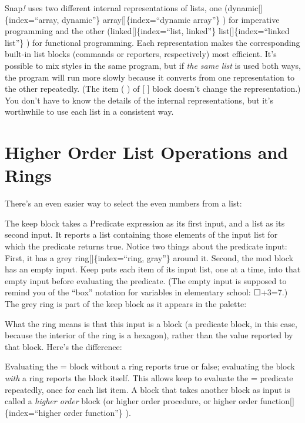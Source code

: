 \documentclass[
  letterpaper,
]{book}
\begin{document}
Snap\emph{!} uses two different internal representations of lists, one
(dynamic{[}{]}\{index=``array, dynamic''\} array{[}{]}\{index=``dynamic
array''\} ) for imperative programming and the other
(linked{[}{]}\{index=``list, linked''\} list{[}{]}\{index=``linked
list''\} ) for functional programming. Each representation makes the
corresponding built-in list blocks (commands or reporters, respectively)
most efficient. It's possible to mix styles in the same program, but if
\emph{the same list} is used both ways, the program will run more slowly
because it converts from one representation to the other repeatedly.
(The item ( ) of {[} {]} block doesn't change the representation.) You
don't have to know the details of the internal representations, but it's
worthwhile to use each list in a consistent way.

\section{Higher Order List Operations and
Rings}\label{higher-order-list-operations-and-rings}

There's an even easier way to select the even numbers from a list:

The keep block takes a Predicate expression as its first input, and a
list as its second input. It reports a list containing those elements of
the input list for which the predicate returns true. Notice two things
about the predicate input: First, it has a grey
ring{[}{]}\{index=``ring, gray''\} around it. Second, the mod block has
an empty input. Keep puts each item of its input list, one at a time,
into that empty input before evaluating the predicate. (The empty input
is supposed to remind you of the ``box'' notation for variables in
elementary school: ☐+3=7.) The grey ring is part of the keep block as it
appears in the palette:

What the ring means is that this input is a block (a predicate block, in
this case, because the interior of the ring is a hexagon), rather than
the value reported by that block. Here's the difference:

Evaluating the = block without a ring reports true or false; evaluating
the block \emph{with} a ring reports the block itself. This allows keep
to evaluate the = predicate repeatedly, once for each list item. A block
that takes another block as input is called a \emph{higher order} block
(or higher order procedure, or higher order
function{[}{]}\{index=``higher order function''\} ).
\end{document}
